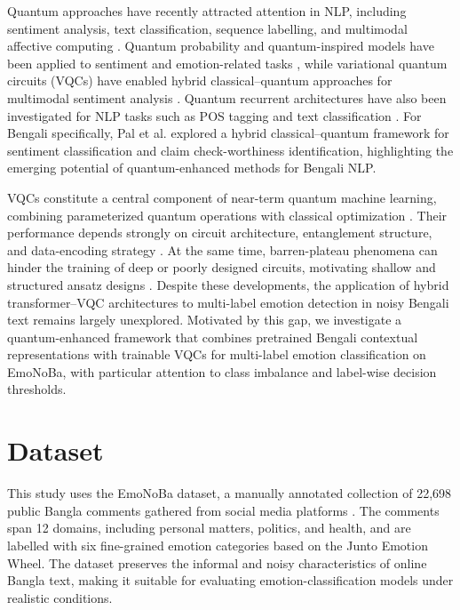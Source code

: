 \documentclass[runningheads]{llncs}
\begin{document}
Quantum approaches have recently attracted attention in NLP, including sentiment analysis, text classification, sequence labelling, and multimodal affective computing \cite{wu2021quantum,guarasci2022quantum,varmantchaonala2024quantum}. Quantum probability and quantum-inspired models have been applied to sentiment and emotion-related tasks \cite{zhang2019quantum,liu2021quantum,li2021qtns}, while variational quantum circuits (VQCs) have enabled hybrid classical--quantum approaches for multimodal sentiment analysis \cite{phukan2023qemma}. Quantum recurrent architectures have also been investigated for NLP tasks such as POS tagging and text classification \cite{pandey2022pos,pandey2023bqlstm,xu2024quantum}. For Bengali specifically, Pal et al. \cite{pal2025quantum} explored a hybrid classical--quantum framework for sentiment classification and claim check-worthiness identification, highlighting the emerging potential of quantum-enhanced methods for Bengali NLP.

VQCs constitute a central component of near-term quantum machine learning, combining parameterized quantum operations with classical optimization \cite{benedetti2019parameterized,mcclean2016theory,schuld2020circuit}. Their performance depends strongly on circuit architecture, entanglement structure, and data-encoding strategy \cite{sim2019expressibility,schuld2021quantum}. At the same time, barren-plateau phenomena can hinder the training of deep or poorly designed circuits, motivating shallow and structured ansatz designs \cite{mcclean2018barren}. Despite these developments, the application of hybrid transformer--VQC architectures to multi-label emotion detection in noisy Bengali text remains largely unexplored. Motivated by this gap, we investigate a quantum-enhanced framework that combines pretrained Bengali contextual representations with trainable VQCs for multi-label emotion classification on EmoNoBa, with particular attention to class imbalance and label-wise decision thresholds.

\section{Dataset}\label{sec:dataset}
This study uses the EmoNoBa dataset, a manually annotated collection of 22,698 public Bangla comments gathered from social media platforms \cite{islam2022emonoba}. The comments span 12 domains, including personal matters, politics, and health, and are labelled with six fine-grained emotion categories based on the Junto Emotion Wheel. The dataset preserves the informal and noisy characteristics of online Bangla text, making it suitable for evaluating emotion-classification models under realistic conditions.
\end{document}
